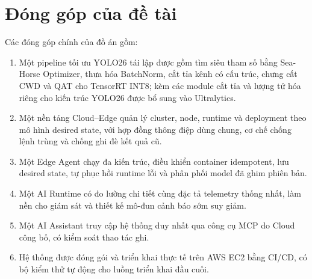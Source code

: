 \section{Đóng góp của đề tài}

Các đóng góp chính của đồ án gồm:

\begin{enumerate}
  \item Một pipeline tối ưu YOLO26 tái lập được gồm tìm siêu tham số bằng
        Sea-Horse Optimizer, thưa hóa BatchNorm, cắt tỉa kênh có cấu trúc, chưng
        cất CWD và QAT cho TensorRT INT8; kèm các module cắt tỉa và lượng tử hóa
        riêng cho kiến trúc YOLO26 được bổ sung vào Ultralytics.
  \item Một nền tảng Cloud--Edge quản lý cluster, node, runtime và deployment
        theo mô hình desired state, với hợp đồng thông điệp dùng chung, cơ chế
        chống lệnh trùng và chống ghi đè kết quả cũ.
  \item Một Edge Agent chạy đa kiến trúc, điều khiển container idempotent, lưu
        desired state, tự phục hồi runtime lỗi và phân phối model đã ghim phiên bản.
  \item Một AI Runtime có đo lường chi tiết cùng đặc tả telemetry thống nhất,
        làm nền cho giám sát và thiết kế mô-đun cảnh báo sớm suy giảm.
  \item Một AI Assistant truy cập hệ thống duy nhất qua công cụ MCP do Cloud công
        bố, có kiểm soát thao tác ghi.
  \item Hệ thống được đóng gói và triển khai thực tế trên AWS EC2 bằng CI/CD, có
        bộ kiểm thử tự động cho luồng triển khai đầu cuối.
\end{enumerate}
